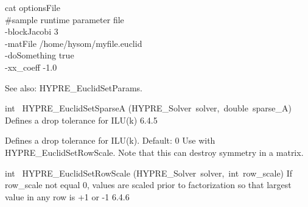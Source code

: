 \documentclass{article}
\begin{document}
\begin{cxxentry}
\begin{cxxentry}
\begin{cxxfunction}
\begin{cxxdoc}
\>cat optionsFile \\
\#sample runtime parameter file \\
-blockJacobi 3 \\
-matFile     /home/hysom/myfile.euclid \\
-doSomething true \\
-xx\_coeff -1.0

See also: HYPRE\_EuclidSetParams.


\end{cxxdoc}
\end{cxxfunction}
\begin{cxxfunction}
{int\ }
        {HYPRE\_EuclidSetSparseA}
        {(HYPRE\_Solver\ solver,\ double\ sparse\_A)}
        {
Defines a drop tolerance for ILU(k)}
        {6.4.5}
\begin{cxxdoc}

Defines a drop tolerance for ILU(k). Default: 0
Use with HYPRE\_EuclidSetRowScale. 
Note that this can destroy symmetry in a matrix.
\end{cxxdoc}
\end{cxxfunction}
\begin{cxxfunction}
{int\ }
        {HYPRE\_EuclidSetRowScale}
        {(HYPRE\_Solver\ solver,\ int\ row\_scale)}
        {
If row\_scale not equal 0, values are scaled prior to factorization
so that largest value in any row is +1 or -1}
        {6.4.6}
\begin{cxxdoc}


\end{cxxdoc}
\end{cxxfunction}
\end{cxxentry}
\end{cxxentry}
\end{document}
